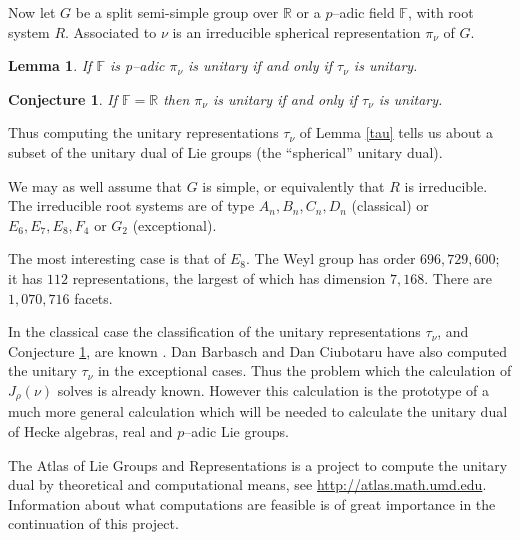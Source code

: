 \documentclass{acm_proc_article-sp}
\newtheorem{conjecture}[equation]{Conjecture}
\newtheorem{lemma}{Lemma}
\begin{document}
Now let $G$ be a split semi-simple group over $\mathbb R$ or a $p$--adic
field $\mathbb F$, with root system
$R$.  Associated to $\nu$ is an irreducible spherical representation
$\pi_\nu$ of $G$.

\begin{lemma}
\label{padic}
If $\mathbb F$ is p--adic $\pi_\nu$ is unitary if and only if $\tau_\nu$ is unitary.
\end{lemma}

\begin{conjecture}
\label{conjecture}
If $\mathbb F=\mathbb R$ then $\pi_\nu$ is unitary if and only if
$\tau_\nu$ is unitary.
\end{conjecture}

Thus computing the unitary representations $\tau_\nu$ of Lemma
\ref{tau} tells us about a subset of the unitary dual of Lie groups
(the ``spherical'' unitary dual).

We may as well assume that $G$ is simple, or equivalently that $R$ is
irreducible. The irreducible root systems are of type
$A_n,B_n,C_n,D_n$ (classical) or $E_6,E_7,E_8, F_4$
or $G_2$ (exceptional).

The most interesting case is that of $E_8$.  The Weyl group has order
$696,729,600$; it has $112$ representations, the largest of which
has dimension $7,168$.  There are $1,070,716$ facets.

In the classical case the classification of the unitary
representations $\tau_\nu$, and Conjecture \ref{conjecture},
are known \cite{barbasch_spherical}.
Dan Barbasch and Dan Ciubotaru have also computed the unitary
$\tau_\nu$ in the exceptional cases.
Thus the problem which the calculation of $J_\rho(\nu)$ solves is
already known. However this calculation is the prototype of a much
more general calculation which will be needed to calculate the unitary
dual of Hecke algebras, real and $p$--adic Lie groups.

The Atlas of Lie Groups and Representations 
is a project to compute  the unitary dual by theoretical and computational
means, see \url{http://atlas.math.umd.edu}. 
Information about what computations are feasible is of
great importance in the continuation of this project.
\end{document}
